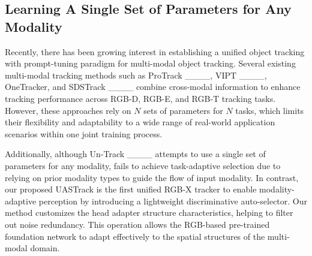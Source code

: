 \subsection{Learning A Single Set of Parameters for Any Modality}
Recently, there has been growing interest in establishing a unified object tracking with prompt-tuning paradigm for multi-modal object tracking. 
Several existing multi-modal tracking methods such as ProTrack ____, VIPT ____, OneTracker, and SDSTrack ____ combine cross-modal information to enhance tracking performance across RGB-D, RGB-E, and RGB-T tracking tasks. 
However, these approaches rely on $N$ sets of parameters for $N$ tasks, which limits their flexibility and adaptability to a wide range of real-world application scenarios within one joint training process.

Additionally, although Un-Track ____ attempts to use a single set of parameters for any modality, fails to achieve task-adaptive selection due to relying on prior modality types to guide the flow of input modality. 
In contrast, our proposed UASTrack is the first unified RGB-X tracker to enable modality-adaptive perception by introducing a lightweight discriminative auto-selector.
Our method customizes the head adapter structure characteristics, helping to filter out noise redundancy. 
This operation allows the RGB-based pre-trained foundation network to adapt effectively to the spatial structures of the multi-modal domain.